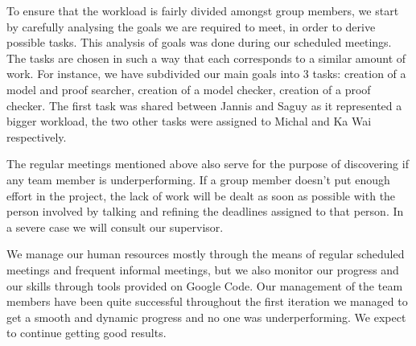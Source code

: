 To ensure that the workload is fairly divided amongst group members, we start by carefully analysing the goals we are required to meet, in order to derive possible tasks. This analysis of goals was done during our scheduled meetings. The tasks are chosen in such a way that each corresponds to a similar amount of work. For instance, we have subdivided our main goals into 3 tasks: creation of a model and proof searcher, creation of a model checker, creation of a proof checker. The first task was shared between Jannis and Saguy as it represented a bigger workload, the two other tasks were assigned to Michal and Ka Wai respectively. 

The regular meetings mentioned above also serve for the purpose of discovering if any team member is underperforming. If a group member doesn't put enough effort in the project, the lack of work will be dealt as soon as possible with the person involved by talking and refining the deadlines assigned to that person. In a severe case we will consult our supervisor.

We manage our human resources mostly through the means of regular scheduled meetings and frequent informal meetings, but we also monitor our progress and our skills through tools provided on Google Code. Our management of the team members have been quite successful throughout the first iteration we managed to get a smooth and dynamic progress and no one was underperforming. We expect to continue getting good results. 
